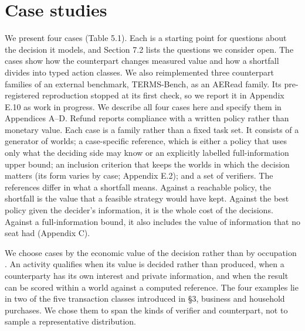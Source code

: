 \section{Case studies}\label{case-studies}\label{sec:cases}

We present four cases (Table 5.1). Each is a starting point for questions about the decision it models, and Section
7.2 lists the questions we consider open. The cases show how the counterpart changes measured value and how a shortfall divides
into typed action classes. We also reimplemented three counterpart families of an external benchmark, TERMS-Bench, as
an AERead family. Its pre-registered reproduction stopped at its first check, so we report it in Appendix E.10 as
work in progress. We describe all four cases here and specify them in Appendices A--D. Refund
reports compliance with a written policy rather than monetary value.
Each case is a family rather than a fixed task set. It consists of a generator of worlds; a case-specific reference,
which is either a policy that uses only what the deciding side may know or an explicitly labelled full-information
upper bound; an inclusion criterion that keeps the worlds in which the decision matters (its form varies by case;
Appendix E.2); and a set of verifiers. The references differ in what a shortfall means. Against a reachable policy,
the shortfall is the value that a feasible strategy would have kept. Against the best policy given the decider's
information, it is the whole cost of the decisions. Against a full-information bound, it also includes the value of
information that no seat had (Appendix C).

We choose cases by the economic value of the decision rather than by occupation \citep{li2026activities}. An activity qualifies when its
value is decided rather than produced, when a counterparty has its own interest and private information, and when the
result can be scored within a world against a computed reference. The four examples lie in two of the five
transaction classes introduced in §3, business and household purchases. We chose them to span the kinds of verifier
and counterpart, not to sample a representative distribution.

